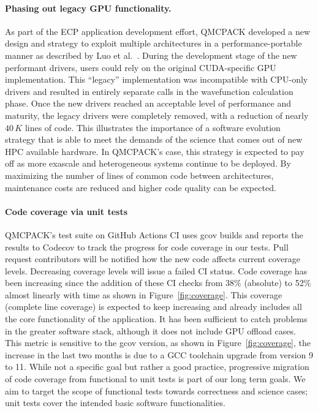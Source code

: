 \paragraph{Phasing out legacy GPU functionality.}
As part of the ECP application development effort, QMCPACK developed a new design and strategy to exploit multiple architectures in a performance-portable manner as described by Luo et al.~\cite{10024599}.
During the development stage of the new performant drivers, users could rely on the original CUDA-specific GPU implementation.
This ``legacy'' implementation was incompatible with CPU-only drivers and resulted in entirely separate calls in the wavefunction calculation phase.
Once the new drivers reached an acceptable level of performance and maturity, the legacy drivers were completely removed, with a reduction of nearly $40\,K$ lines of code.
This illustrates the importance of a software evolution strategy that is able to meet the demands of the science that comes out of new HPC available hardware.
In QMCPACK's case, this strategy is expected to pay off as more exascale and heterogeneous systems continue to be deployed.
By maximizing the number of lines of common code between architectures, maintenance costs are reduced and higher code quality can be expected.

\paragraph{Code coverage via unit tests}
QMCPACK's test suite on GitHub Actions CI uses gcov builds and reports the results to
Codecov to track the progress for code coverage in our tests. 
Pull request contributors will be notified how the new code affects current coverage levels. Decreasing coverage levels will issue a failed CI status.
Code coverage has been increasing since the addition of these CI checks from 38\% (absolute) to 52\% almost linearly with time as shown in Figure~\ref{fig:coverage}.
This coverage (complete line coverage) is expected to keep increasing and already includes all the core functionality of the application. It has been sufficient to catch problems in the greater software stack, although it does not include GPU offload cases. This metric is sensitive to the gcov version, as shown in Figure~\ref{fig:coverage}, the increase in the last two months is due to a GCC toolchain upgrade from version 9 to 11.
While not a specific goal but rather a good practice, progressive migration of code coverage from functional to unit tests is part of our long term goals.
We aim to target the scope of functional tests towards correctness and science cases;
unit tests cover the intended basic software functionalities.

